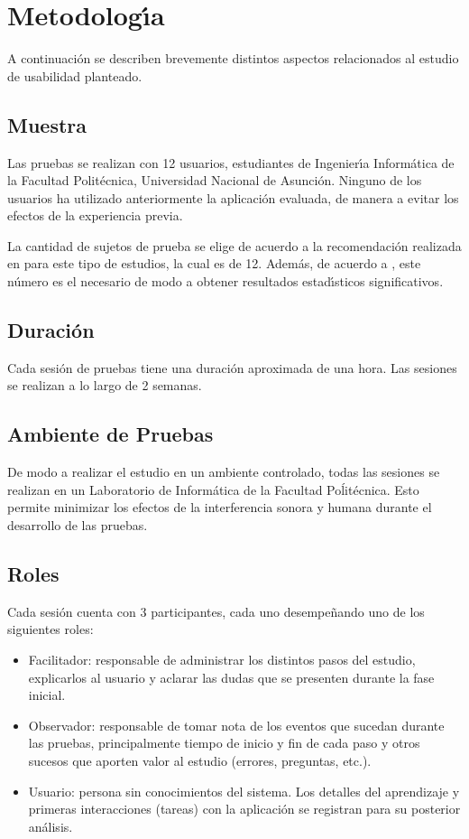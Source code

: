 \section{Metodolog{\'\i}a}
\label{sec:metodolog{\'\i}a}
A continuaci\'on se describen brevemente distintos aspectos relacionados al
estudio de usabilidad planteado.

\subsection{Muestra}
Las pruebas se realizan con 12 usuarios, estudiantes de Ingenier{\'\i}a Inform\'atica
de la Facultad Polit\'ecnica, Universidad Nacional de Asunci\'on. Ninguno de los usuarios 
ha utilizado anteriormente la aplicaci\'on evaluada, de manera a evitar los efectos
de la experiencia previa.

La cantidad de sujetos de prueba se elige de acuerdo a la recomendaci\'on realizada
en \cite{Hwang:2010} para este tipo de estudios, la cual es de 12. 
Adem\'as, de acuerdo a \cite[p.~267]{Rubin2008}, este n\'umero es el necesario de modo a obtener
resultados estad{\'\i}sticos significativos.

\subsection{Duraci\'on}
Cada sesi\'on de pruebas tiene una duraci\'on aproximada de una hora.
Las sesiones se realizan a lo largo de 2 semanas.

\subsection{Ambiente de Pruebas}
De modo a realizar el estudio en un ambiente controlado, todas las sesiones se
realizan en un Laboratorio de Inform\'atica de la Facultad Poĺit\'ecnica. Esto
permite minimizar los efectos de la interferencia sonora y humana durante el
desarrollo de las pruebas.

\subsection{Roles}
Cada sesi\'on cuenta con 3 participantes, cada uno desempe\~nando uno de los siguientes roles:
	\begin{itemize}
		\item Facilitador: responsable de administrar los distintos pasos del estudio, explicarlos al usuario 
		y aclarar las dudas que se presenten durante la fase inicial. 
		\item Observador: responsable de tomar nota de los eventos que sucedan durante las pruebas, principalmente
		tiempo de inicio y fin de cada paso y otros sucesos que aporten valor al estudio (errores, preguntas, etc.).
		\item Usuario: persona sin conocimientos del sistema. Los detalles del aprendizaje y primeras interacciones
		(tareas) con la aplicaci\'on se registran para su posterior an\'alisis.	
	\end{itemize}

